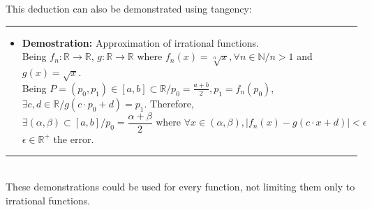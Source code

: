 \documentclass[a4paper, 11pt]{article}
\begin{document}
\begin{enumerate}
 This deduction can also be demonstrated using tangency:\\
    \rule{\linewidth}{0.4pt}
    \begin{itemize}
        \item \textbf{Demostration:} Approximation of irrational functions.\\
 Being $f_n:\mathbb{R}\rightarrow\mathbb{R}$, $g:\mathbb{R}\rightarrow\mathbb{R}$ where $f_n(x) = \sqrt[n]{x}, \forall n \in \mathbb{N} / n > 1$ and $g(x) = \sqrt{x}$.\\
 Being $P=(p_0, p_1)\in[a,b]\subset \mathbb{R} / p_0 = \frac{a+b}{2}, p_1 = f_n(p_0)$, \\$\exists c,d\in\mathbb{R} / g(c\cdot p_0 + d) = p_1$.
 Therefore, 
        $$\exists (\alpha, \beta) \subset [a,b] / p_0 = \frac{\alpha + \beta}{2} \text{ where } \forall x \in (\alpha, \beta), |f_n(x) - g(c\cdot x + d)| < \epsilon$$
        $\epsilon\in\mathbb{R^+}$ the error.
    \end{itemize}
    \rule{\linewidth}{0.4pt}\\
 These demonstrations could be used for every function, not limiting them only to irrational functions.
\end{enumerate}
\end{document}
